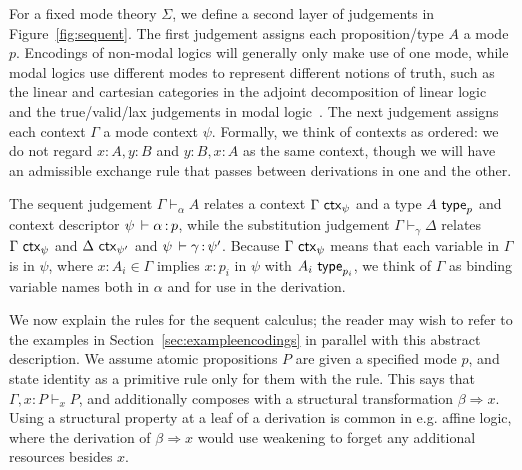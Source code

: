 \documentclass[a4paper,USenglish]{lipics-v2016}
\newcommand\spr{\ensuremath{\Rightarrow}} %
\newcommand\seq[3]{\ensuremath{#1 \vdash_{#2} #3}}
\newcommand\wftype[2]{\ensuremath{#1 \,\, \dsd{type}_{#2}}}
\renewcommand\wfctx[2]{\ensuremath{#1 \,\, \dsd{ctx}_{#2}}}
\renewcommand{\oftp}[3]{\ensuremath{#1 \, \vdash #2 \, \dcd{:} \, #3}}
\newcommand\citep[1]{\cite{#1}}
\begin{document}
For a fixed mode theory $\Sigma$, we define a second layer of judgements
in Figure~\ref{fig:sequent}.  The first judgement assigns each
proposition/type $A$ a mode $p$.  Encodings of non-modal logics will
generally only make use of one mode, while modal logics use different
modes to represent different notions of truth, such as the linear and
cartesian categories in the adjoint decomposition of linear
logic~\citep{benton94mixed,bentonwadler96adjoint} and the true/valid/lax
judgements in modal logic~\citep{pfenningdavies}.  The next judgement
assigns each context $\Gamma$ a mode context $\psi$.  Formally, we think
of contexts as ordered: we do not regard $x:A,y:B$ and $y:B,x:A$ as the
same context, though we will have an admissible exchange rule that
passes between derivations in one and the other.

The sequent judgement \seq{\Gamma}{\alpha}{A} relates a context
$\wfctx{\Gamma}{\psi}$ and a type $\wftype{A}{p}$ and context descriptor
\oftp{\psi}{\alpha}{p}, while the substitution judgement \seq{\Gamma}{\gamma}{\Delta} relates
$\wfctx{\Gamma}{\psi}$ and $\wfctx{\Delta}{\psi'}$ and
$\oftp{\psi}{\gamma}{\psi'}$. Because $\wfctx{\Gamma}{\psi}$ means that
each variable in $\Gamma$ is in $\psi$, where $x : A_i \in \Gamma$
implies $x : p_i$ in $\psi$ with \wftype{A_i}{p_i}, we think of $\Gamma$
as binding variable names both in $\alpha$ and for use in the
derivation.

We now explain the rules for the sequent calculus; the reader may wish
to refer to the examples in Section~\ref{sec:exampleencodings} in
parallel with this abstract description.  We assume atomic propositions
$P$ are given a specified mode $p$, and state identity as a primitive
rule only for them with the  rule.  This says that
\seq{\Gamma,x:P}{x}{P}, and additionally composes with a structural
transformation $\beta \spr x$.  Using a structural property at a leaf of
a derivation is common in e.g. affine logic, where the derivation of
$\beta \spr x$ would use weakening to forget any additional resources
besides $x$.
\end{document}
